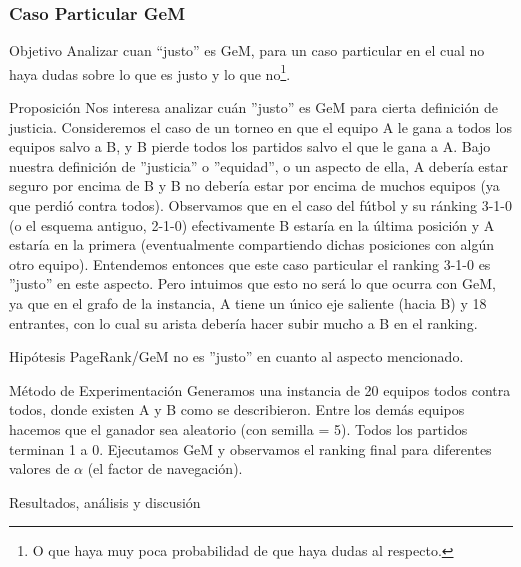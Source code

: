 \subsubsection{Caso Particular GeM}
\label{subsec:exp8}
\begin{LaTeXdescription}
    \item[Objetivo] Analizar cuan ``justo'' es GeM, para un caso particular en
        el cual no haya dudas sobre lo que es justo y lo que no\footnote{O que
        haya muy poca probabilidad de que haya dudas al respecto.}.\\

    \item[Proposici\'on] Nos interesa analizar cu\'an ''justo'' es GeM para
        cierta definici\'on de justicia. Consideremos el caso de un torneo en
        que el equipo A le gana a todos los equipos salvo a B, y B pierde todos
        los partidos salvo el que le gana a A. Bajo nuestra definición de
        ''justicia'' o ''equidad'', o un aspecto de ella, A deber\'ia estar
        seguro por encima de B y B no deber\'ia estar por encima de muchos
        equipos (ya que perdi\'o contra todos). Observamos que en el caso del
        f\'utbol y su ránking 3-1-0 (o el esquema antiguo, 2-1-0) efectivamente
        B estar\'ia en la \'ultima posici\'on y A estar\'ia en la primera
        (eventualmente compartiendo dichas posiciones con alg\'un otro equipo).
        Entendemos entonces que este caso particular el ranking 3-1-0 es
        ''justo'' en este aspecto. Pero intuimos que esto no ser\'a lo que
        ocurra con GeM, ya que en el grafo de la instancia, A tiene un \'unico
        eje saliente (hacia B) y 18 entrantes, con lo cual su arista deber\'ia
        hacer subir mucho a B en el ranking.\\

    \item[Hip\'otesis] PageRank/GeM no es ''justo'' en cuanto al aspecto
        mencionado.\\

    \item[M\'etodo de Experimentaci\'on] Generamos una instancia de 20 equipos
        todos contra todos, donde existen A y B como se describieron. Entre los
        dem\'as equipos hacemos que el ganador sea aleatorio (con semilla =
        5). Todos los partidos terminan 1 a 0. Ejecutamos GeM y observamos el
        ranking final para diferentes valores de $\alpha$ (el factor de
        navegaci\'on).\\

    \item[Resultados, an\'alisis y discusi\'on]
\end{LaTeXdescription}

